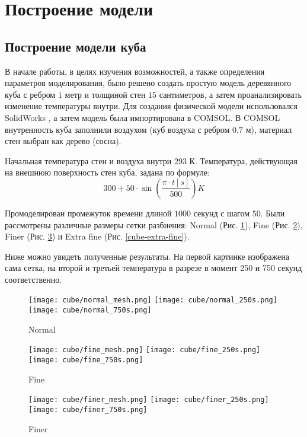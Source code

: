 \graphicspath{{./images/model}}
\section{Построение модели}


\subsection{Построение модели куба}

В начале работы, в целях изучения возможностей, а также определения параметров моделирования, было решено создать простую модель деревянного куба с ребром $1$ метр и толщиной стен $15$ сантиметров, а затем проанализировать изменение температуры внутри. Для создания физической модели использовался SolidWorks \cite{solidworks}, а затем модель была импортирована в COMSOL. В COMSOL внутренность куба заполнили воздухом (куб воздуха с ребром $0.7$ м), материал стен выбран как дерево (сосна).

Начальная температура стен и воздуха внутри $293$ К. Температура, действующая на внешнюю поверхность стен куба, задана по формуле:
\[300 + 50 \cdot \sin(\frac{\pi \cdot t[s]}{500}) K\]

Промоделирован промежуток времени длиной $1000$ секунд с шагом $50$.
Были рассмотрены различные размеры сетки разбиения: Normal (Рис. \ref{cube-normal}), Fine (Рис. \ref{cube-fine}), Finer (Рис. \ref{cube-finer}) и Extra fine (Рис. \ref{cube-extra-fine}).

Ниже можно увидеть полученные результаты. На первой картинке изображена сама сетка, на второй и третьей температура в разрезе в момент 250 и 750 секунд соответственно.

\begin{figure}[H]
\texttt{[image: cube/normal\_mesh.png]}\hfill
\texttt{[image: cube/normal\_250s.png]}\hfill
\texttt{[image: cube/normal\_750s.png]}\hfill
\caption{Normal}
\label{cube-normal}
\end{figure}

\begin{figure}[H]
\texttt{[image: cube/fine\_mesh.png]}\hfill
\texttt{[image: cube/fine\_250s.png]}\hfill
\texttt{[image: cube/fine\_750s.png]}\hfill
\caption{Fine}
\label{cube-fine}
\end{figure}

\begin{figure}[H]
\texttt{[image: cube/finer\_mesh.png]}\hfill
\texttt{[image: cube/finer\_250s.png]}\hfill
\texttt{[image: cube/finer\_750s.png]}\hfill
\caption{Finer}
\label{cube-finer}
\end{figure}

